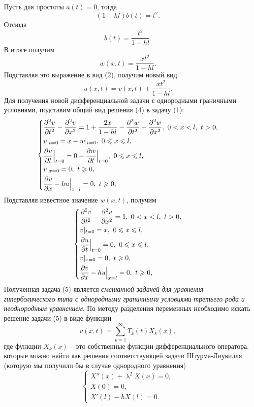 \documentclass[a4paper, 12pt]{report}
\numberwithin{equation}{section}
\renewcommand{\leq}{\leqslant}
\renewcommand{\geq}{\geqslant}
\renewcommand{\lambda}{\uplambda}
\renewcommand{\d}{\partial}
\newcommand{\sumk}{\sum\limits_{k=1}^\infty}
\begin{document}
	Пусть для простоты $a(t) = 0$, тогда
	$$(1-hl)b(t) =t^2.$$
	Отсюда
	$$b(t) = \dfrac{t^2}{1-hl}.$$
	В итоге получим
	$$w(x,t) = \dfrac{xt^2}{1-hl}.$$
	Подставляя это выражение в вид (2), получим новый вид
	\begin{equation}
		u(x,t) = v(x,t) + \dfrac{xt^2}{1-hl}.
	\end{equation}
	Для получения новой дифференциальной задачи с однородными граничными условиями, подставим общий вид решения (4) в задачу (1):
	\begin{equation*}
		\begin{dcases}
			\dfrac{\d^2 v}{\d t^2} - \dfrac{\d^2 v}{\d x^2} = 1 + \dfrac{2x}{1-hl} - \dfrac{\d^2 w}{\d t^2} + \dfrac{\d^2 w}{\d x^2},\ 0<x<l,\ t>0,\\
			v|_{t=0} = x - w|_{t=0},\ 0\leq x\leq l,\\
			\dfrac{\d u}{\d t}\Big|_{t=0} = 0 - \dfrac{\d w}{\d t}\Big|_{t=0},\ 0\leq x\leq l,\\
			v|_{x=0} = 0,\ t\geq 0,\\
			\dfrac{\d v}{\d x} - hu\Big|_{x=l} = 0,\ t \geq 0,
		\end{dcases}
	\end{equation*}
	Подставляя известное значение $w(x,t)$, получим
	\begin{equation}
		\begin{dcases}
			\dfrac{\d^2 v}{\d t^2} - \dfrac{\d^2 v}{\d x^2} = 1,\ 0<x<l,\ t>0,\\
			v|_{t=0} = x ,\ 0\leq x\leq l,\\
			\dfrac{\d u}{\d t}\Big|_{t=0} = 0,\ 0\leq x\leq l,\\
			v|_{x=0} = 0,\ t\geq 0,\\
			\dfrac{\d v}{\d x} - hu\Big|_{x=l} = 0,\ t \geq 0,
		\end{dcases}
	\end{equation}
	Полученная задача (5) является \textit{смешанной задачей для уравнения гиперболического типа с однородными граничными условиями третьего рода и неоднородным уравнением}. По методу разделения переменных необходимо искать решение задачи (5) в виде функции
	\begin{equation}
		v(x,t) = \sumk T_k(t) X_k(x),
	\end{equation}
	где функции $X_k(x)$ -- это собственные функции дифференциального оператора, которые можно найти как решения соответствующей задачи Штурма-Лиувилля (которую мы получили бы в случае однородного уравнения)
	\begin{equation}
		\begin{cases}
			X''(x) + \lambda^2 X(x) = 0,\\
			X(0) = 0,\\
			X'(l) - hX(l) = 0.
		\end{cases}
	\end{equation}
\end{document}
